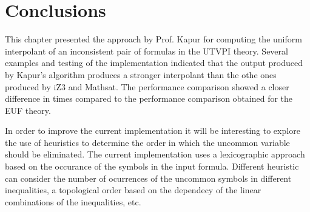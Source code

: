 \section{Conclusions}

This chapter presented the approach
by Prof. Kapur for computing
the uniform interpolant of an inconsistent
pair of formulas in the UTVPI theory.
Several examples and testing of the implementation
indicated that the output produced by Kapur's
algorithm produces a stronger interpolant 
than the othe ones produced by iZ3 and Mathsat.
The performance comparison showed a closer
difference in times compared to the performance 
comparison obtained for the EUF theory. 

In order to improve the current implementation it
will be interesting to explore the use of heuristics to 
determine the order in which the uncommon variable 
should be eliminated. The current implementation uses
a lexicographic approach based on the occurance of the
symbols in the input formula. Different heuristic
can consider the number of ocurrences of the uncommon
symbols in different inequalities, a topological order
based on the dependecy of the linear combinations of
the inequalities, etc. 


